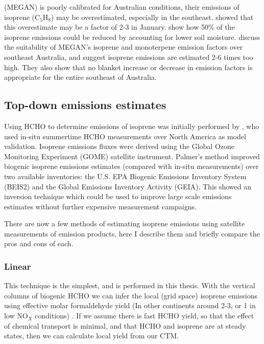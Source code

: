     (MEGAN) is poorly calibrated for Australian conditions, their emissions of isoprene (C$_5$H$_8$) may be overestimated, especially in the southeast.
    \textcite{Stavrakou2015} showed that this overestimate may be a factor of 2-3 in January.
    \textcite{Sindelarova2014} show how 50\% of the isoprene emissions could be reduced by accounting for lower soil moisture.
    \textcite{Emmerson2016} discuss the suitability of MEGAN's isoprene and monoterpene emission factors over southeast Australia, and suggest isoprene emissions are estimated 2-6 times too high.
    They also show that no blanket increase or decrease in emission factors is appropriate for the entire southeast of Australia.
  
    
  
  \subsection{Top-down emissions estimates}
    
    Using HCHO to determine emissions of isoprene was initially performed by \textcite{Palmer2001, Palmer2003}, who used in-situ summertime HCHO measurements over North America as model validation.
    Isoprene emissions fluxes were derived using the Global Ozone Monitoring Experiment (GOME) satellite instrument.
    Palmer's method improved biogenic isoprene emissions estimates (compared with in-situ measurements) over two available inventories: the U.S. EPA Biogenic Emissions Inventory System (BEIS2) and the Global Emissions Inventory Activity (GEIA).
    This showed an inversion technique which could be used to improve large scale emissions estimates without further expensive measurement campaigns.

    There are now a few methods of estimating isoprene emissions using satellite measurements of emission products, here I describe them and briefly compare the pros and cons of each.
    
    \subsubsection{Linear}
      \label{BioIsop:intro:top_down_linear}
      
      This technique is the simplest, and is performed in this thesis.
      With the vertical columns of biogenic HCHO we can infer the local (grid space) isoprene emissions using effective molar formaldehyde yield (In other continents around 2-3, or 1 in low NO$_X$ conditions) \parencite{Palmer2003,Marais2012,Bauwens2016}.
      If we assume there is fast HCHO yield, so that the effect of chemical transport is minimal, and that HCHO and isoprene are at steady states, then we can calculate local yield from our CTM.
      
